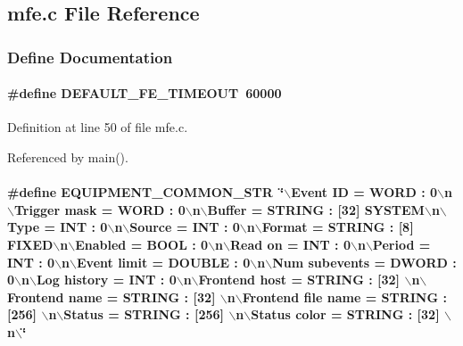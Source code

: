 \subsection{mfe.c File Reference}
\label{mfe_8c}


\subsubsection{Define Documentation}
\paragraph[{DEFAULT\_\-FE\_\-TIMEOUT}]{\setlength{\rightskip}{0pt plus 5cm}\#define DEFAULT\_\-FE\_\-TIMEOUT~60000}\hfill\label{mfe_8c_a093e717ef9582e83efcc2550ef0c28cb}


Definition at line 50 of file mfe.c.

Referenced by main().
\paragraph[{EQUIPMENT\_\-COMMON\_\-STR}]{\setlength{\rightskip}{0pt plus 5cm}\#define EQUIPMENT\_\-COMMON\_\-STR~\char`\"{}$\backslash$Event ID = {\bf WORD} : 0$\backslash$n$\backslash$Trigger mask = {\bf WORD} : 0$\backslash$n$\backslash$Buffer = STRING : \mbox{[}32\mbox{]} SYSTEM$\backslash$n$\backslash$Type = {\bf INT} : 0$\backslash$n$\backslash$Source = {\bf INT} : 0$\backslash$n$\backslash$Format = STRING : \mbox{[}8\mbox{]} FIXED$\backslash$n$\backslash$Enabled = {\bf BOOL} : 0$\backslash$n$\backslash$Read on = {\bf INT} : 0$\backslash$n$\backslash$Period = {\bf INT} : 0$\backslash$n$\backslash$Event limit = DOUBLE : 0$\backslash$n$\backslash$Num subevents = {\bf DWORD} : 0$\backslash$n$\backslash$Log history = {\bf INT} : 0$\backslash$n$\backslash$Frontend host = STRING : \mbox{[}32\mbox{]} $\backslash$n$\backslash$Frontend name = STRING : \mbox{[}32\mbox{]} $\backslash$n$\backslash$Frontend file name = STRING : \mbox{[}256\mbox{]} $\backslash$n$\backslash$Status = STRING : \mbox{[}256\mbox{]} $\backslash$n$\backslash$Status color = STRING : \mbox{[}32\mbox{]} $\backslash$n$\backslash$\char`\"{}}\hfill\label{mfe_8c_ac92b30327caaa939b1b6630775c78ecd}


